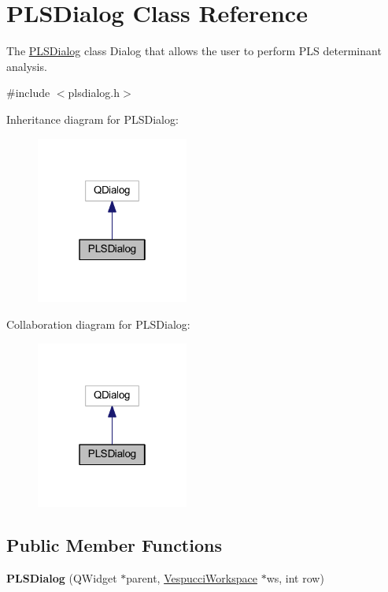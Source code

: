 \hypertarget{class_p_l_s_dialog}{\section{P\+L\+S\+Dialog Class Reference}
\label{class_p_l_s_dialog}
}


The \hyperlink{class_p_l_s_dialog}{P\+L\+S\+Dialog} class Dialog that allows the user to perform P\+L\+S determinant analysis.  




{\ttfamily \#include $<$plsdialog.\+h$>$}



Inheritance diagram for P\+L\+S\+Dialog\+:\nopagebreak
\begin{figure}[H]
\begin{center}
\leavevmode
\includegraphics[width=142pt]{class_p_l_s_dialog__inherit__graph}
\end{center}
\end{figure}


Collaboration diagram for P\+L\+S\+Dialog\+:\nopagebreak
\begin{figure}[H]
\begin{center}
\leavevmode
\includegraphics[width=142pt]{class_p_l_s_dialog__coll__graph}
\end{center}
\end{figure}
\subsection*{Public Member Functions}
\begin{DoxyCompactItemize}
\item 
\hypertarget{class_p_l_s_dialog_a9228d37fa0dc85ec90e4286a8f73020f}{{\bfseries P\+L\+S\+Dialog} (Q\+Widget $\ast$parent, \hyperlink{class_vespucci_workspace}{Vespucci\+Workspace} $\ast$ws, int row)}\label{class_p_l_s_dialog_a9228d37fa0dc85ec90e4286a8f73020f}

\end{DoxyCompactItemize}


